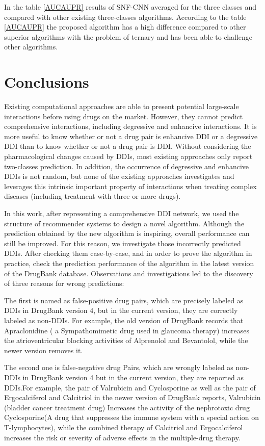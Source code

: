 \documentclass{bmcart}
\begin{document}
In the table
\ref{AUCAUPR}
results of SNF-CNN averaged for the three classes and compared with other existing three-classes algorithms. According to the table
\ref{AUCAUPR} the proposed algorithm has a high difference compared to other superior algorithms with the problem of ternary and has been able to challenge other algorithms.


\section*{Conclusions}
Existing computational approaches are able to present potential large-scale interactions before using drugs on the market. However, they cannot predict comprehensive interactions, including degressive and enhancive interactions. It is more useful to know whether or not a drug pair is enhancive DDI or a degressive DDI  than to know whether or not a drug pair is DDI. Without considering the pharmacological changes caused by DDIs, most existing approaches only report two-classes prediction.  In addition, the occurrence of degressive and enhancive DDIs is not random, but none of the existing approaches investigates and leverages this intrinsic important property of interactions when treating complex diseases (including treatment with three or more drugs).

In this work, after representing a comprehensive DDI network, we used the structure of recommender systems to design a novel algorithm. Although the prediction obtained by the new algorithm is inspiring, overall performance can still be improved. For this reason, we investigate those incorrectly predicted DDIs. After checking them case-by-case, and in order to prove the algorithm in practice, check the prediction performance of the algorithm in the latest version of the DrugBank database. Observations and investigations led to the discovery of three reasons for wrong predictions:

The first is named as false-positive drug pairs, which are precisely labeled as DDIs in DrugBank version 4, but in the current version, they are correctly labeled as non-DDIs. For example, the old version of DrugBank records that Apraclonidine ( a Sympathomimetic drug used in glaucoma therapy) increases the atrioventricular blocking activities of Alprenolol and Bevantolol, while the newer version removes it.

The second one is false-negative drug Pairs, which are wrongly labeled as non-DDIs in DrugBank version 4  but in the current version, they are reported as DDIs.For example, the pair of Valrubicin and Cyclosporine as well as the pair of Ergocalciferol and  Calcitriol in the newer version of DrugBank reports, Valrubicin (bladder cancer treatment drug) Increases the activity of the nephrotoxic drug Cyclosporine(A drug that suppresses the immune system with a special action on T-lymphocytes), while the combined therapy of Calcitriol and Ergocalciferol increases the risk or severity of adverse effects in the multiple-drug therapy.
\end{document}
